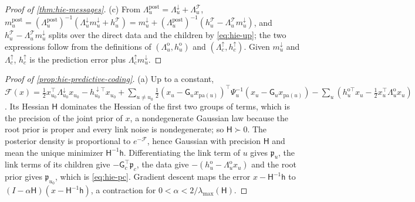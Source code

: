\begin{proof}[Proof of \cref{thm:hie-messages}]
(c) From $\Lambda^{\mathrm{post}}_u=\Lambda^\downarrow_u+\Lambda^{\mathcal T}_u$, $m^{\mathrm{post}}_u=(\Lambda^{\mathrm{post}}_u)^{-1}(\Lambda^\downarrow_um^\downarrow_u+h^{\mathcal T}_u)=m^\downarrow_u+(\Lambda^{\mathrm{post}}_u)^{-1}(h^{\mathcal T}_u-\Lambda^{\mathcal T}_um^\downarrow_u)$, and $h^{\mathcal T}_u-\Lambda^{\mathcal T}_um^\downarrow_u$ splits over the direct data and the children by \eqref{eq:hie-up}; the two expressions follow from the definitions of $(\Lambda^{\mathrm o}_u,h^{\mathrm o}_u)$ and $(\Lambda^\uparrow_c,h^\uparrow_c)$. Given $m^\downarrow_u$ and $\Lambda^\uparrow_c$, $h^\uparrow_c$ is the prediction error plus $\Lambda^\uparrow_cm^\downarrow_u$.
\end{proof}

\begin{proof}[Proof of \cref{prop:hie-predictive-coding}]
(a) Up to a constant, $\mathcal F(x)=\frac12x_{u_0}^\top\Lambda^\downarrow_{u_0}x_{u_0}-h^{\downarrow\top}_{u_0}x_{u_0}+\sum_{u\neq u_0}\frac12(x_u-\mathsf G_ux_{\mathrm{pa}(u)})^\top\Psi_u^{-1}(x_u-\mathsf G_ux_{\mathrm{pa}(u)})-\sum_u(h^{\mathrm o\top}_ux_u-\frac12x_u^\top\Lambda^{\mathrm o}_ux_u)$. Its Hessian $\mathsf H$ dominates the Hessian of the first two groups of terms, which is the precision of the joint prior of $x$, a nondegenerate Gaussian law because the root prior is proper and every link noise is nondegenerate; so $\mathsf H\succ0$. The posterior density is proportional to $e^{-\mathcal F}$, hence Gaussian with precision $\mathsf H$ and mean the unique minimizer $\mathsf H^{-1}\mathsf h$. Differentiating the link term of $u$ gives $\mathfrak p_u$, the link terms of its children give $-\mathsf G_c^\top\mathfrak p_c$, the data give $-(h^{\mathrm o}_u-\Lambda^{\mathrm o}_ux_u)$ and the root prior gives $\mathfrak p_{u_0}$, which is \eqref{eq:hie-pc}. Gradient descent maps the error $x-\mathsf H^{-1}\mathsf h$ to $(I-\alpha\mathsf H)(x-\mathsf H^{-1}\mathsf h)$, a contraction for $0<\alpha<2/\lambda_{\max}(\mathsf H)$.


\end{proof}
